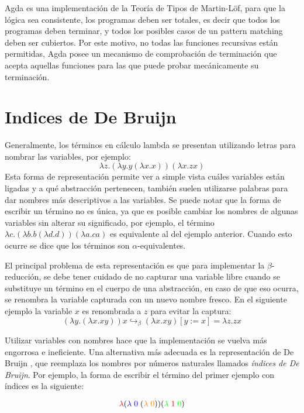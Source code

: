 Agda es una implementación de la Teoría de Tipos de Martin-Löf, para que la lógica sea consistente, los programas deben ser totales, es decir que todos los programas deben terminar, y todos los posibles casos de un pattern matching deben ser cubiertos.
Por este motivo, no todas las funciones recursivas están permitidas, Agda posee un mecanismo de comprobación de terminación que acepta aquellas funciones para las que puede probar mecánicamente su terminación.


\section{Indices de De Bruijn}
Generalmente, los términos en cálculo lambda se presentan utilizando letras para nombrar las variables, por ejemplo:
\[ \lambda z. (\lambda y. y (\lambda x. x)) (\lambda x. z x) \]
Esta forma de representación permite ver a simple vista cuáles variables están ligadas y a qué abstracción pertenecen, también suelen utilizarse palabras para dar nombres más descriptivos a las variables.
Se puede notar que la forma de escribir un término no es única, ya que es posible cambiar los nombres de algunas variables sin alterar su significado, por ejemplo, el término $\lambda c. (\lambda b. b (\lambda d. d)) (\lambda a. c a)$ es equivalente al del ejemplo anterior.
Cuando esto ocurre se dice que los términos son $\alpha$-equivalentes.

El principal problema de esta representación es que para implementar la $\beta$-reducción, se debe tener cuidado de no capturar una variable libre cuando se substituye un término en el cuerpo de una abstracción, en caso de que eso ocurra, se renombra la variable capturada con un nuevo nombre fresco.
En el siguiente ejemplo la variable $x$ es renombrada a $z$ para evitar la captura:
\[ (\lambda y. (\lambda x. x y)) x \hookrightarrow_{\beta} (\lambda x. x y)[y := x] = \lambda z. z x \]

Utilizar variables con nombres hace que la implementación se vuelva más engorrosa e ineficiente.
Una alternativa más adecuada es la representación de De Bruijn \cite{debrujin_index}, que reemplaza los nombres por números naturales llamados \textit{índices de De Bruijn}.
Por ejemplo, la forma de escribir el término del primer ejemplo con índices es la siguiente:

\[ \textcolor{red}{\lambda} (\textcolor{blue}{\lambda\; 0} \; (\textcolor{orange}{\lambda\; 0})) (\textcolor{green}{\lambda}\; \textcolor{red}{1} \; \textcolor{green}{0}) \]

